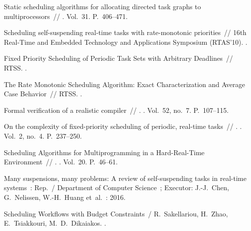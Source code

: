 \begin{thebibliography}{10}
 Static scheduling algorithms for allocating
  directed task graphs to multiprocessors~// 
  \BibDash
{}. \BibDash
\newblock Vol.~31. \BibDash
\newblock P.~406--471.

 Scheduling self-suspending real-time tasks
  with rate-monotonic priorities~// 16th Real-Time and Embedded Technology and
  Applications Symposium (RTAS’10). \BibDash
{}.

 Fixed Priority Scheduling of Periodic Task Sets with
  Arbitrary Deadlines~// RTSS. \BibDash
{}.

 The Rate Monotonic Scheduling
  Algorithm: Exact Characterization and Average Case Behavior~// RTSS. \BibDash
{}.

 Formal verification of a realistic compiler~//
  . \BibDash
{}. \BibDash
\newblock Vol.~52, no.~7. \BibDash
\newblock P.~107--115.

 On the complexity of fixed-priority
  scheduling of periodic, real-time tasks~// .
  \BibDash
{}. \BibDash
\newblock Vol.~2, no.~4. \BibDash
\newblock P.~237--250.

 Scheduling Algorithms for Multiprogramming
  in a Hard-Real-Time Environment~// . \BibDash
{}. \BibDash
\newblock Vol.~20. \BibDash
\newblock P.~46--61.

Many suspensions, many problems: A review of self-suspending tasks in real-time
  systems~: Rep.~/ Department of Computer Science~; Executor: J.-J.~Chen,
  G.~Nelissen, W.-H.~Huang et~al.~: 2016.

Scheduling Workflows with Budget Constraints~/ R.~Sakellariou, H.~Zhao,
  E.~Tsiakkouri, M.~D.~Dikaiakos. \BibDash
{}.


\end{thebibliography}
